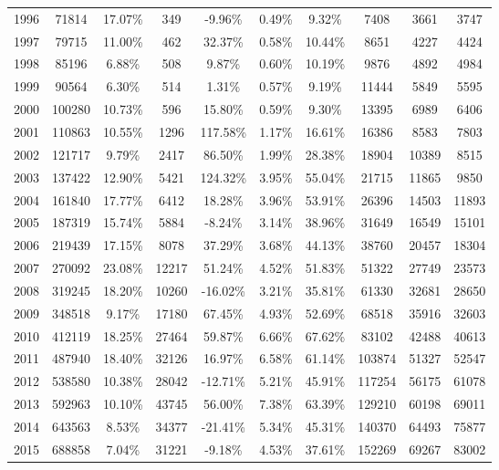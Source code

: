 \begin{table}[p]
{\begin{tabular}{@{}cccccccccc@{}}
1996 & 71814   & 17.07\% & 349   & -9.96\%   & 0.49\% & 9.32\%  & 7408   & 3661  & 3747   \\
1997 & 79715   & 11.00\% & 462   & 32.37\%   & 0.58\% & 10.44\% & 8651   & 4227  & 4424   \\
1998 & 85196   & 6.88\%  & 508   & 9.87\%    & 0.60\% & 10.19\% & 9876   & 4892  & 4984   \\
1999 & 90564   & 6.30\%  & 514   & 1.31\%    & 0.57\% & 9.19\%  & 11444  & 5849  & 5595   \\
2000 & 100280  & 10.73\% & 596   & 15.80\%   & 0.59\% & 9.30\%  & 13395  & 6989  & 6406   \\
2001 & 110863  & 10.55\% & 1296  & 117.58\%  & 1.17\% & 16.61\% & 16386  & 8583  & 7803   \\
2002 & 121717  & 9.79\%  & 2417  & 86.50\%   & 1.99\% & 28.38\% & 18904  & 10389 & 8515   \\
2003 & 137422  & 12.90\% & 5421  & 124.32\%  & 3.95\% & 55.04\% & 21715  & 11865 & 9850   \\
2004 & 161840  & 17.77\% & 6412  & 18.28\%   & 3.96\% & 53.91\% & 26396  & 14503 & 11893  \\
2005 & 187319  & 15.74\% & 5884  & -8.24\%   & 3.14\% & 38.96\% & 31649  & 16549 & 15101  \\
2006 & 219439  & 17.15\% & 8078  & 37.29\%   & 3.68\% & 44.13\% & 38760  & 20457 & 18304  \\
2007 & 270092  & 23.08\% & 12217 & 51.24\%   & 4.52\% & 51.83\% & 51322  & 27749 & 23573  \\
2008 & 319245  & 18.20\% & 10260 & -16.02\%  & 3.21\% & 35.81\% & 61330  & 32681 & 28650  \\
2009 & 348518  & 9.17\%  & 17180 & 67.45\%   & 4.93\% & 52.69\% & 68518  & 35916 & 32603  \\
2010 & 412119  & 18.25\% & 27464 & 59.87\%   & 6.66\% & 67.62\% & 83102  & 42488 & 40613  \\
2011 & 487940  & 18.40\% & 32126 & 16.97\%   & 6.58\% & 61.14\% & 103874 & 51327 & 52547  \\
2012 & 538580  & 10.38\% & 28042 & -12.71\%  & 5.21\% & 45.91\% & 117254 & 56175 & 61078  \\
2013 & 592963  & 10.10\% & 43745 & 56.00\%   & 7.38\% & 63.39\% & 129210 & 60198 & 69011  \\
2014 & 643563  & 8.53\%  & 34377 & -21.41\%  & 5.34\% & 45.31\% & 140370 & 64493 & 75877  \\
2015 & 688858  & 7.04\%  & 31221 & -9.18\%   & 4.53\% & 37.61\% & 152269 & 69267 & 83002  \\

\end{tabular}}
\end{table}
